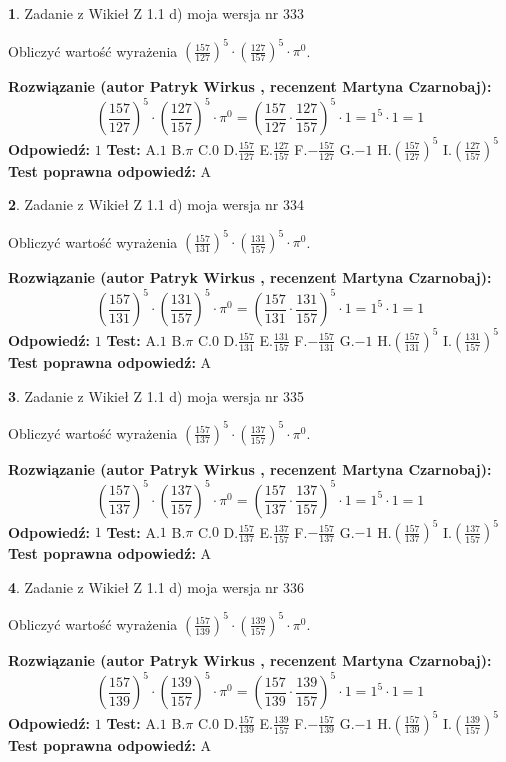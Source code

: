 \documentclass[12pt, a4paper]{article}
\theoremstyle{definition} %
\newtheorem{zad}{}
\newcommand{\zadStart}[1]{\begin{zad}#1\newline}
\newcommand{\zadStop}{\end{zad}}
\newcommand{\rozwStart}[2]{\noindent \textbf{Rozwiązanie (autor #1 , recenzent #2): }\newline}
\newcommand{\rozwStop}{\newline}
\newcommand{\odpStart}{\noindent \textbf{Odpowiedź:}\newline}
\newcommand{\odpStop}{\newline}
\newcommand{\testStart}{\noindent \textbf{Test:}\newline}
\newcommand{\testStop}{\newline}
\newcommand{\kluczStart}{\noindent \textbf{Test poprawna odpowiedź:}\newline}
\newcommand{\kluczStop}{\newline}
\begin{document}
\zadStart{Zadanie z Wikieł Z 1.1 d) moja wersja nr 333}

Obliczyć wartość wyrażenia $(\frac{157}{127})^{5} \cdot (\frac{127}{157})^{5} \cdot \pi^{0}$.
\zadStop
\rozwStart{Patryk Wirkus}{Martyna Czarnobaj}
$$(\frac{157}{127})^{5} \cdot (\frac{127}{157})^{5} \cdot \pi^{0} = (\frac{157}{127} \cdot \frac{127}{157})^{5} \cdot 1 = 1^{5} \cdot 1 = 1$$
\rozwStop
\odpStart
$1$
\odpStop
\testStart
A.$1$ B.$\pi$ C.$0$ D.$\frac{157}{127}$ E.$\frac{127}{157}$
F.$-\frac{157}{127}$ G.$-1$
H.$(\frac{157}{127})^{5}$
I.$(\frac{127}{157})^{5}$
\testStop
\kluczStart
A
\kluczStop



\zadStart{Zadanie z Wikieł Z 1.1 d) moja wersja nr 334}

Obliczyć wartość wyrażenia $(\frac{157}{131})^{5} \cdot (\frac{131}{157})^{5} \cdot \pi^{0}$.
\zadStop
\rozwStart{Patryk Wirkus}{Martyna Czarnobaj}
$$(\frac{157}{131})^{5} \cdot (\frac{131}{157})^{5} \cdot \pi^{0} = (\frac{157}{131} \cdot \frac{131}{157})^{5} \cdot 1 = 1^{5} \cdot 1 = 1$$
\rozwStop
\odpStart
$1$
\odpStop
\testStart
A.$1$ B.$\pi$ C.$0$ D.$\frac{157}{131}$ E.$\frac{131}{157}$
F.$-\frac{157}{131}$ G.$-1$
H.$(\frac{157}{131})^{5}$
I.$(\frac{131}{157})^{5}$
\testStop
\kluczStart
A
\kluczStop



\zadStart{Zadanie z Wikieł Z 1.1 d) moja wersja nr 335}

Obliczyć wartość wyrażenia $(\frac{157}{137})^{5} \cdot (\frac{137}{157})^{5} \cdot \pi^{0}$.
\zadStop
\rozwStart{Patryk Wirkus}{Martyna Czarnobaj}
$$(\frac{157}{137})^{5} \cdot (\frac{137}{157})^{5} \cdot \pi^{0} = (\frac{157}{137} \cdot \frac{137}{157})^{5} \cdot 1 = 1^{5} \cdot 1 = 1$$
\rozwStop
\odpStart
$1$
\odpStop
\testStart
A.$1$ B.$\pi$ C.$0$ D.$\frac{157}{137}$ E.$\frac{137}{157}$
F.$-\frac{157}{137}$ G.$-1$
H.$(\frac{157}{137})^{5}$
I.$(\frac{137}{157})^{5}$
\testStop
\kluczStart
A
\kluczStop



\zadStart{Zadanie z Wikieł Z 1.1 d) moja wersja nr 336}

Obliczyć wartość wyrażenia $(\frac{157}{139})^{5} \cdot (\frac{139}{157})^{5} \cdot \pi^{0}$.
\zadStop
\rozwStart{Patryk Wirkus}{Martyna Czarnobaj}
$$(\frac{157}{139})^{5} \cdot (\frac{139}{157})^{5} \cdot \pi^{0} = (\frac{157}{139} \cdot \frac{139}{157})^{5} \cdot 1 = 1^{5} \cdot 1 = 1$$
\rozwStop
\odpStart
$1$
\odpStop
\testStart
A.$1$ B.$\pi$ C.$0$ D.$\frac{157}{139}$ E.$\frac{139}{157}$
F.$-\frac{157}{139}$ G.$-1$
H.$(\frac{157}{139})^{5}$
I.$(\frac{139}{157})^{5}$
\testStop
\kluczStart
A
\kluczStop
\end{document}
